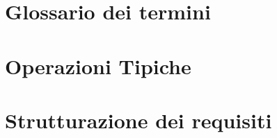 
 
 
    
   \section{Glossario dei termini}
   
   
   \section{Operazioni Tipiche}
   
   
  \section{Strutturazione dei requisiti}
   
  
  
  